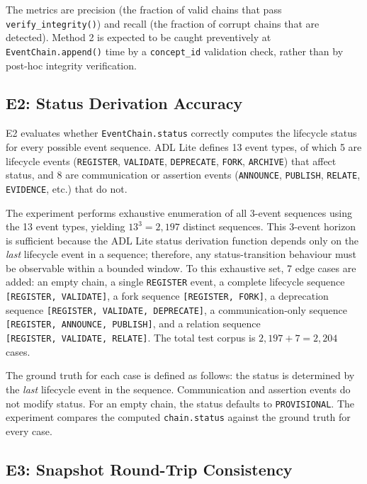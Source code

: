 The metrics are precision (the fraction of valid chains that pass \texttt{verify\_integrity()}) and recall (the fraction of corrupt chains that are detected). Method 2 is expected to be caught preventively at \texttt{EventChain.append()} time by a \texttt{concept\_id} validation check, rather than by post-hoc integrity verification.

\subsection{E2: Status Derivation Accuracy}\label{e2-status-derivation-accuracy}

E2 evaluates whether \texttt{EventChain.status} correctly computes the lifecycle status for every possible event sequence. ADL Lite defines 13 event types, of which 5 are lifecycle events (\texttt{REGISTER}, \texttt{VALIDATE}, \texttt{DEPRECATE}, \texttt{FORK}, \texttt{ARCHIVE}) that affect status, and 8 are communication or assertion events (\texttt{ANNOUNCE}, \texttt{PUBLISH}, \texttt{RELATE}, \texttt{EVIDENCE}, etc.) that do not.

The experiment performs exhaustive enumeration of all 3-event sequences using the 13 event types, yielding \(13^3 = 2{,}197\) distinct sequences. This 3-event horizon is sufficient because the ADL Lite status derivation function depends only on the \emph{last} lifecycle event in a sequence; therefore, any status-transition behaviour must be observable within a bounded window. To this exhaustive set, 7 edge cases are added: an empty chain, a single \texttt{REGISTER} event, a complete lifecycle sequence \texttt{{[}REGISTER,\ VALIDATE{]}}, a fork sequence \texttt{{[}REGISTER,\ FORK{]}}, a deprecation sequence \texttt{{[}REGISTER,\ VALIDATE,\ DEPRECATE{]}}, a communication-only sequence \texttt{{[}REGISTER,\ ANNOUNCE,\ PUBLISH{]}}, and a relation sequence \texttt{{[}REGISTER,\ VALIDATE,\ RELATE{]}}. The total test corpus is \(2{,}197 + 7 = 2{,}204\) cases.

The ground truth for each case is defined as follows: the status is determined by the \emph{last} lifecycle event in the sequence. Communication and assertion events do not modify status. For an empty chain, the status defaults to \texttt{PROVISIONAL}. The experiment compares the computed \texttt{chain.status} against the ground truth for every case.

\subsection{E3: Snapshot Round-Trip Consistency}\label{e3-snapshot-round-trip-consistency}

